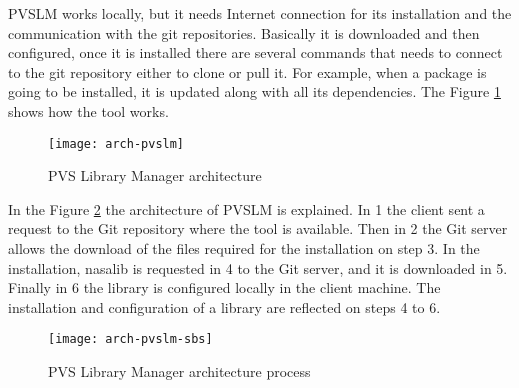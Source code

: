 PVSLM works locally, but it needs Internet connection for its installation and the communication with the git repositories. Basically it is downloaded and then configured, once it is installed there are several commands that needs to connect to the git repository either to clone or pull it. For example, when a package is going to be installed, it is updated along with all its dependencies. The Figure \ref{fig:archi} shows how the tool works.

\begin{figure}[h!]
  \centering
  \texttt{[image: arch-pvslm]}
  \caption{PVS Library Manager architecture}
  \label{fig:archi}
\end{figure}

In the Figure \ref{fig:archi-prc} the architecture of PVSLM is explained. In 1 the client sent a request to the Git repository where the tool is available. Then in 2 the Git server allows the download of the files required for the installation on step 3. In the installation, nasalib is requested in 4 to the Git server, and it is downloaded in 5. Finally in 6 the library is configured locally in the client machine. The installation and configuration of a library are reflected on steps 4 to 6.

\begin{figure}[h!]
  \centering
  \texttt{[image: arch-pvslm-sbs]}
  \caption{PVS Library Manager architecture process}
  \label{fig:archi-prc}
\end{figure}

